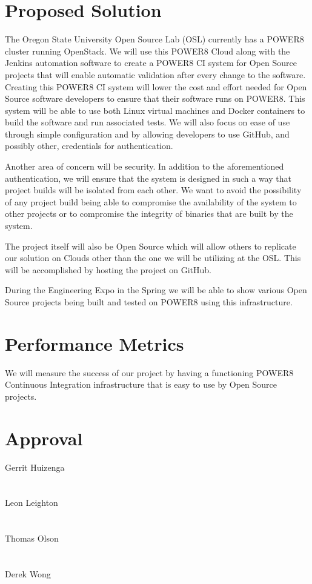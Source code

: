 \documentclass[10pt,letterpaper,onecolumn,draftclsnofoot]{IEEEtran}
\begin{document}
\section*{Proposed Solution}
The Oregon State University Open Source Lab (OSL) currently has a POWER8 cluster running OpenStack.
We will use this POWER8 Cloud along with the Jenkins automation software to create a POWER8 CI system for Open Source projects that will enable automatic validation after every change to the software. 
Creating this POWER8 CI system will lower the cost and effort needed for Open Source software developers to ensure that their software runs on POWER8.
This system will be able to use both Linux virtual machines and Docker containers to build the software and run associated tests. 
We will also focus on ease of use through simple configuration and by allowing developers to use GitHub, and possibly other, credentials for authentication.


Another area of concern will be security. In addition to the aforementioned authentication, we will ensure that the system is designed in such a way that project builds will be isolated from each other. We want to avoid the possibility of any project build being able to compromise the availability of the system to other projects or to compromise the integrity of binaries that are built by the system.


The project itself will also be Open Source which will allow others to replicate our solution on Clouds other than the one we will be utilizing at the OSL\@. 
This will be accomplished by hosting the project on GitHub. 

During the Engineering Expo in the Spring we will be able to show various Open Source projects being built and tested on POWER8 using this infrastructure.


\section*{Performance Metrics}
We will measure the success of our project by having a functioning POWER8 Continuous Integration infrastructure that is easy to use by Open Source projects. 

\clearpage
\section*{Approval}

\noindent Gerrit Huizenga\hspace{0.7cm} \makebox[1.5in]{\hrulefill}\\\\\\
Leon Leighton\hspace{0.7cm} \makebox[1.5in]{\hrulefill}\\\\\\
Thomas Olson\hspace{0.3cm} \makebox[1.5in]{\hrulefill}\\\\\\
Derek Wong\hspace{0.7cm} \makebox[1.5in]{\hrulefill}\\\\\\
\end{document}
